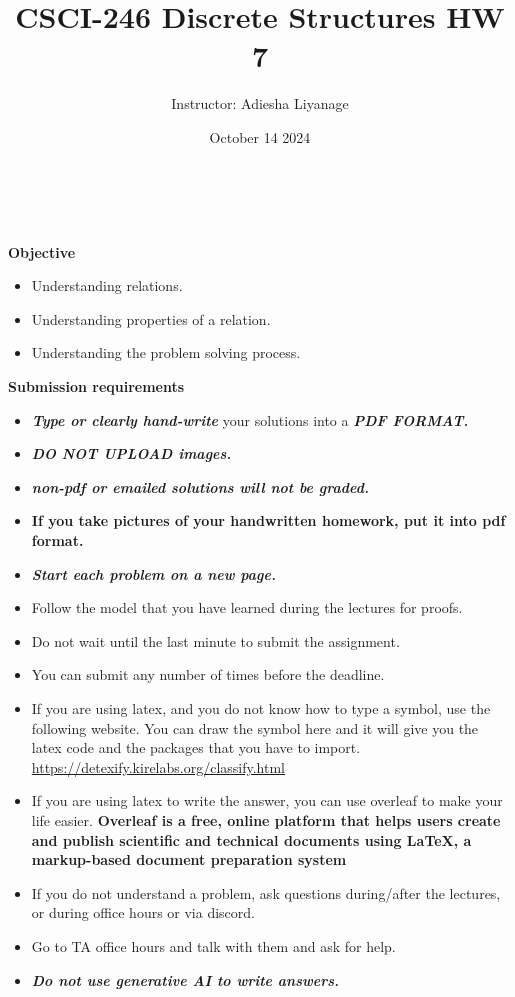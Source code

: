 \documentclass[12pt]{exam}
\title{CSCI-246 Discrete Structures HW 7}
\author{Instructor: Adiesha Liyanage}
\date{October 14 2024}
\begin{document}
\maketitle

\hrulefill
\\
\\
\textbf{Objective}
\begin{itemize}
    \item Understanding relations.
    \item Understanding properties of a relation.
    \item Understanding the problem solving process.
\end{itemize}

\textbf{Submission requirements}
\begin{itemize}
    \item \textbf{\textit{Type or clearly hand-write}} your solutions into a \textbf{\textit{PDF FORMAT.}} 
    \item \textbf{\textit{DO NOT UPLOAD images.}}
    \item \textbf{\textit{non-pdf or emailed solutions will not be graded.}}
    \item \textbf{If you take pictures of your handwritten homework, put it into pdf format.}
    \item \textbf{\textit{Start each problem on a new page.}}
    \item Follow the model that you have learned during the lectures for proofs.
    \item Do not wait until the last minute to submit the assignment.
    \item You can submit any number of times before the deadline. 
    \item If you are using latex, and you do not know how to type a symbol, use the following website. You can draw the symbol here and it will give you the latex code and the packages that you have to import. \url{https://detexify.kirelabs.org/classify.html}
    \item If you are using latex to write the answer, you can use overleaf to make your life easier. \textbf{Overleaf is a free, online platform that helps users create and publish scientific and technical documents using LaTeX, a markup-based document preparation system}
    \item If you do not understand a problem, ask questions during/after the lectures, or during office hours or via discord.
    \item Go to TA office hours and talk with them and ask for help.
    \item \textbf{\textit{Do not use generative AI to write answers.}} 
\end{itemize}
\end{document}

